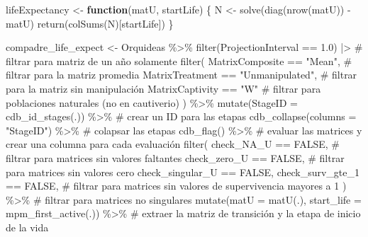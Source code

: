 \documentclass[
  12pt,
  letterpaper,
]{book}
\newenvironment{Shaded}{\begin{snugshade}}{\end{snugshade}}
\newcommand{\AttributeTok}[1]{\textcolor[rgb]{0.40,0.45,0.13}{#1}}
\newcommand{\CommentTok}[1]{\textcolor[rgb]{0.37,0.37,0.37}{#1}}
\newcommand{\ConstantTok}[1]{\textcolor[rgb]{0.56,0.35,0.01}{#1}}
\newcommand{\ControlFlowTok}[1]{\textcolor[rgb]{0.00,0.23,0.31}{\textbf{#1}}}
\newcommand{\FloatTok}[1]{\textcolor[rgb]{0.68,0.00,0.00}{#1}}
\newcommand{\FunctionTok}[1]{\textcolor[rgb]{0.28,0.35,0.67}{#1}}
\newcommand{\NormalTok}[1]{\textcolor[rgb]{0.00,0.23,0.31}{#1}}
\newcommand{\OtherTok}[1]{\textcolor[rgb]{0.00,0.23,0.31}{#1}}
\newcommand{\SpecialCharTok}[1]{\textcolor[rgb]{0.37,0.37,0.37}{#1}}
\newcommand{\StringTok}[1]{\textcolor[rgb]{0.13,0.47,0.30}{#1}}
\begin{document}
\begin{Shaded}
\begin{Highlighting}[]
\NormalTok{lifeExpectancy }\OtherTok{\textless{}{-}} \ControlFlowTok{function}\NormalTok{(matU, startLife) \{}
\NormalTok{  N }\OtherTok{\textless{}{-}} \FunctionTok{solve}\NormalTok{(}\FunctionTok{diag}\NormalTok{(}\FunctionTok{nrow}\NormalTok{(matU)) }\SpecialCharTok{{-}}\NormalTok{ matU)}
  \FunctionTok{return}\NormalTok{(}\FunctionTok{colSums}\NormalTok{(N)[startLife])}
\NormalTok{\}}


\NormalTok{compadre\_life\_expect }\OtherTok{\textless{}{-}}\NormalTok{ Orquideas }\SpecialCharTok{\%\textgreater{}\%}
  \FunctionTok{filter}\NormalTok{(ProjectionInterval }\SpecialCharTok{==} \FloatTok{1.0}\NormalTok{) }\SpecialCharTok{|\textgreater{}} \CommentTok{\# filtrar para matriz de un año solamente}
  \FunctionTok{filter}\NormalTok{(}
\NormalTok{    MatrixComposite }\SpecialCharTok{==} \StringTok{"Mean"}\NormalTok{, }\CommentTok{\# filtrar para la matriz promedia}
\NormalTok{    MatrixTreatment }\SpecialCharTok{==} \StringTok{"Unmanipulated"}\NormalTok{, }\CommentTok{\# filtrar para la matriz sin manipulación}
\NormalTok{    MatrixCaptivity }\SpecialCharTok{==} \StringTok{"W"} \CommentTok{\# filtrar para poblaciones naturales (no en cautiverio)}
\NormalTok{  ) }\SpecialCharTok{\%\textgreater{}\%}
  \FunctionTok{mutate}\NormalTok{(}\AttributeTok{StageID =} \FunctionTok{cdb\_id\_stages}\NormalTok{(.)) }\SpecialCharTok{\%\textgreater{}\%} \CommentTok{\# crear un ID para las etapas}
  \FunctionTok{cdb\_collapse}\NormalTok{(}\AttributeTok{columns =} \StringTok{"StageID"}\NormalTok{) }\SpecialCharTok{\%\textgreater{}\%} \CommentTok{\# colapsar las etapas}
  \FunctionTok{cdb\_flag}\NormalTok{() }\SpecialCharTok{\%\textgreater{}\%} \CommentTok{\# evaluar las matrices y crear una columna para cada evaluación}
  \FunctionTok{filter}\NormalTok{(}
\NormalTok{    check\_NA\_U }\SpecialCharTok{==} \ConstantTok{FALSE}\NormalTok{, }\CommentTok{\# filtrar para matrices sin valores faltantes}
\NormalTok{    check\_zero\_U }\SpecialCharTok{==} \ConstantTok{FALSE}\NormalTok{, }\CommentTok{\# filtrar para matrices sin valores cero}
\NormalTok{    check\_singular\_U }\SpecialCharTok{==} \ConstantTok{FALSE}\NormalTok{,}
\NormalTok{    check\_surv\_gte\_1 }\SpecialCharTok{==} \ConstantTok{FALSE}\NormalTok{, }\CommentTok{\# filtrar para matrices sin valores de supervivencia mayores a 1}
\NormalTok{  ) }\SpecialCharTok{\%\textgreater{}\%} \CommentTok{\# filtrar para matrices no singulares}
  \FunctionTok{mutate}\NormalTok{(}\AttributeTok{matU =} \FunctionTok{matU}\NormalTok{(.), }\AttributeTok{start\_life =} \FunctionTok{mpm\_first\_active}\NormalTok{(.)) }\SpecialCharTok{\%\textgreater{}\%} \CommentTok{\# extraer la matriz de transición y la etapa de inicio de la vida}

\end{Highlighting}
\end{Shaded}
\end{document}
